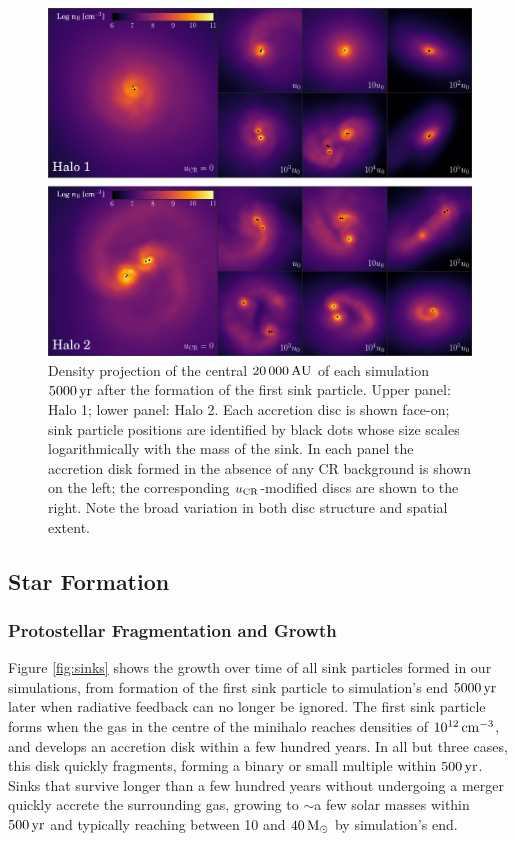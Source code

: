 \documentclass[usenatbib]{mn2e}
\newcommand{\cc}{\,{\rm cm}^{-3}}
\newcommand{\msun}{\,{\rm M}_{\odot}}
\newcommand{\au}{\,{\rm AU}}
\newcommand{\yr}{\,{\rm yr}}
\newcommand{\ucr}{{u}_{\rm \small CR}}
\begin{document}
\begin{figure}
\begin{center}
\includegraphics[width=1\textwidth]{figures/disks/disks}
\caption{\label{fig:disks} 
Density projection of the central $20\,000\au$ of each simulation $5000\yr$ after the formation of the first sink particle.
Upper panel: Halo 1; lower panel: Halo 2.
Each accretion disc is shown face-on; sink particle positions are identified by black dots whose size scales logarithmically with the mass of the sink.
In each panel the accretion disk formed in the absence of any CR background is shown on the left; the corresponding $\ucr$-modified discs are shown to the right.
Note the broad variation in both disc structure and spatial extent.%
}
\end{center}
\end{figure}

\subsection{Star Formation}
\subsubsection{Protostellar Fragmentation and Growth}
\label{sub:sink_formation}

Figure \ref{fig:sinks} shows the growth over time of all sink particles formed in our simulations, from formation of the first sink particle to simulation's end $5000\yr$ later when radiative feedback can no longer be ignored. 
The first sink particle forms when the gas in the centre of the minihalo reaches densities of $10^{12}\cc$, and develops an accretion disk within a few hundred years. 
In all but three cases, this disk quickly fragments, forming a binary or small multiple within $500\yr$. 
Sinks that survive longer than a few hundred years without undergoing a merger quickly accrete the surrounding gas, growing to $\sim$a few solar masses within $500\yr$ and typically reaching between 10 and $40\msun$ by simulation's end.
\end{document}
